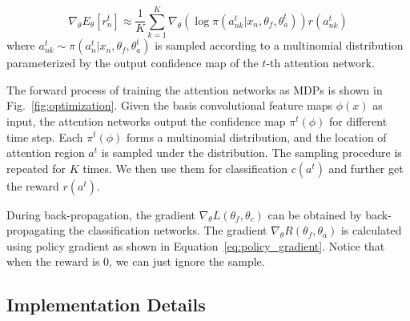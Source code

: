 \documentclass[10pt,twocolumn,letterpaper]{article}
\begin{document}
\begin{equation}
\nabla_{\theta} E_{\theta}[r^t_n] \approx \frac{1}{K} \sum_{k=1}^K \nabla_{\theta} \left(\log \pi(a^t_{nk} | x_n, \theta_f, \theta^t_a)\right) r(a^t_{nk})
\label{eq:policy_gradient}
\end{equation}
where $a^t_{nk}\sim \pi(a^t_n | x_n, \theta_f, \theta^t_a) $ is sampled according to a multinomial distribution parameterized by the output confidence map of the $t$-th attention network.

The forward process of training the attention networks as MDPs is shown in Fig.~\ref{fig:optimization}. Given the basis convolutional feature maps $\phi(x)$ as input, the attention networks output the confidence map $\pi^t(\phi)$ for different time step. Each $\pi^t(\phi)$ forms a multinomial distribution, and the location of attention region $a^t$ is sampled under the distribution. The sampling procedure is repeated for $K$ times. We then use them for classification $c(a^t)$ and further get the reward $r(a^t)$.

During back-propagation, the gradient $\nabla_{\theta} L(\theta_f, \theta_c)$ can be  obtained by back-propagating the classification networks.
The gradient $\nabla_{\theta} R(\theta_f, \theta_a)$ is calculated using policy gradient as shown in Equation~\ref{eq:policy_gradient}.
Notice that when the reward is 0, we can just ignore the sample.

\subsection{Implementation Details}
\end{document}
